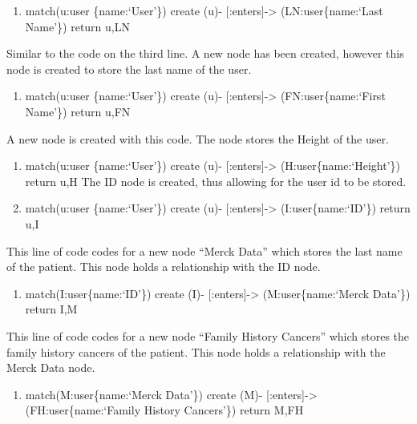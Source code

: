 \documentclass[]{book}
\providecommand{\tightlist}{%
  \setlength{\itemsep}{0pt}\setlength{\parskip}{0pt}}
\begin{document}
\begin{enumerate}
\def\labelenumi{\arabic{enumi}.}
\setcounter{enumi}{2}
\tightlist
\item
  match(u:user \{name:`User'\}) create (u)- {[}:enters{]}-\textgreater{}
  (LN:user\{name:`Last Name'\}) return u,LN
\end{enumerate}

Similar to the code on the third line. A new node has been created,
however this node is created to store the last name of the user.

\begin{enumerate}
\def\labelenumi{\arabic{enumi}.}
\setcounter{enumi}{3}
\tightlist
\item
  match(u:user \{name:`User'\}) create (u)- {[}:enters{]}-\textgreater{}
  (FN:user\{name:`First Name'\}) return u,FN
\end{enumerate}

A new node is created with this code. The node stores the Height of the
user.

\begin{enumerate}
\def\labelenumi{\arabic{enumi}.}
\setcounter{enumi}{4}
\item
  match(u:user \{name:`User'\}) create (u)- {[}:enters{]}-\textgreater{}
  (H:user\{name:`Height'\}) return u,H The ID node is created, thus
  allowing for the user id to be stored.
\item
  match(u:user \{name:`User'\}) create (u)- {[}:enters{]}-\textgreater{}
  (I:user\{name:`ID'\}) return u,I
\end{enumerate}

This line of code codes for a new node ``Merck Data'' which stores the
last name of the patient. This node holds a relationship with the ID
node.

\begin{enumerate}
\def\labelenumi{\arabic{enumi}.}
\setcounter{enumi}{6}
\tightlist
\item
  match(I:user\{name:`ID'\}) create (I)- {[}:enters{]}-\textgreater{}
  (M:user\{name:`Merck Data'\}) return I,M
\end{enumerate}

This line of code codes for a new node ``Family History Cancers'' which
stores the family history cancers of the patient. This node holds a
relationship with the Merck Data node.

\begin{enumerate}
\def\labelenumi{\arabic{enumi}.}
\setcounter{enumi}{7}
\tightlist
\item
  match(M:user\{name:`Merck Data'\}) create (M)-
  {[}:enters{]}-\textgreater{} (FH:user\{name:`Family History
  Cancers'\}) return M,FH
\end{enumerate}
\end{document}
